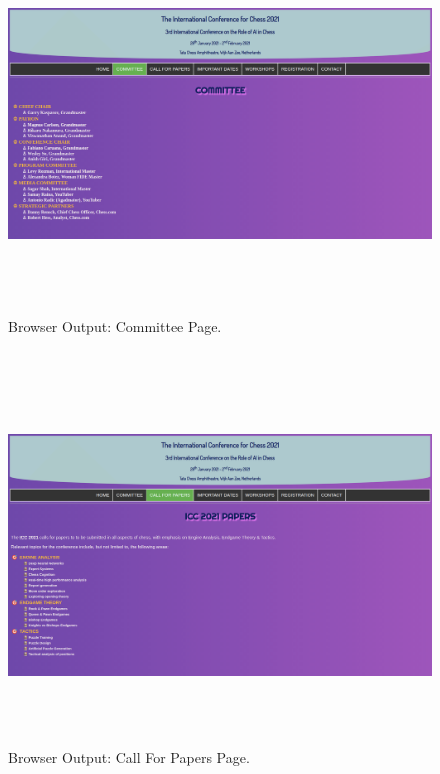 \documentclass[12pt, a4]{article}
\begin{document}
\newpage
\subsection*{}
\begin{figure}[h]
\centering
\caption{Browser Output: Committee Page.}
\includegraphics[height=10cm, width=18cm, keepaspectratio]{Output/Committee.png}
\end{figure}

\newpage
\subsection*{}
\begin{figure}[h]
\centering
\caption{Browser Output: Call For Papers Page.}
\includegraphics[height=10cm, width=18cm, keepaspectratio]{Output/Papers.png}
\end{figure}
\end{document}
